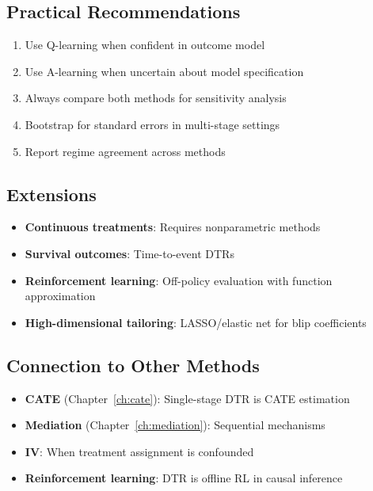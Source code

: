 \subsection{Practical Recommendations}

\begin{enumerate}
\item Use Q-learning when confident in outcome model
\item Use A-learning when uncertain about model specification
\item Always compare both methods for sensitivity analysis
\item Bootstrap for standard errors in multi-stage settings
\item Report regime agreement across methods
\end{enumerate}

\subsection{Extensions}

\begin{itemize}
\item \textbf{Continuous treatments}: Requires nonparametric methods
\item \textbf{Survival outcomes}: Time-to-event DTRs
\item \textbf{Reinforcement learning}: Off-policy evaluation with function approximation
\item \textbf{High-dimensional tailoring}: LASSO/elastic net for blip coefficients
\end{itemize}

\subsection{Connection to Other Methods}

\begin{itemize}
\item \textbf{CATE} (Chapter~\ref{ch:cate}): Single-stage DTR is CATE estimation
\item \textbf{Mediation} (Chapter~\ref{ch:mediation}): Sequential mechanisms
\item \textbf{IV}: When treatment assignment is confounded
\item \textbf{Reinforcement learning}: DTR is offline RL in causal inference
\end{itemize}
